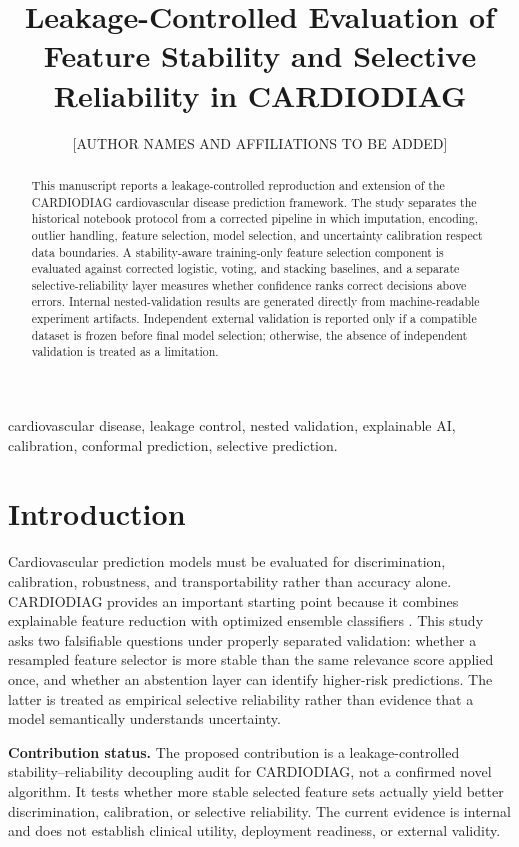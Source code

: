 \documentclass[journal]{IEEEtran}
\title{Leakage-Controlled Evaluation of Feature Stability and Selective Reliability in CARDIODIAG}
\author{[AUTHOR NAMES AND AFFILIATIONS TO BE ADDED]}
\begin{document}
\maketitle

\begin{abstract}
This manuscript reports a leakage-controlled reproduction and extension of the
CARDIODIAG cardiovascular disease prediction framework. The study separates the
historical notebook protocol from a corrected pipeline in which imputation,
encoding, outlier handling, feature selection, model selection, and uncertainty
calibration respect data boundaries. A stability-aware training-only feature
selection component is evaluated against corrected logistic, voting, and
stacking baselines, and a separate selective-reliability layer measures whether
confidence ranks correct decisions above errors. Internal nested-validation
results are generated directly from machine-readable experiment artifacts.
Independent external validation is reported only if a compatible dataset is
frozen before final model selection; otherwise, the absence of independent
validation is treated as a limitation.
\end{abstract}

\begin{IEEEkeywords}
cardiovascular disease, leakage control, nested validation, explainable AI,
calibration, conformal prediction, selective prediction.
\end{IEEEkeywords}

\section{Introduction}
Cardiovascular prediction models must be evaluated for discrimination,
calibration, robustness, and transportability rather than accuracy alone.
CARDIODIAG provides an important starting point because it combines explainable
feature reduction with optimized ensemble classifiers \cite{khan2026cardiodiag}.
This study asks two falsifiable questions under properly separated validation:
whether a resampled feature selector is more stable than the same relevance
score applied once, and whether an abstention layer can identify higher-risk
predictions. The latter is treated as empirical selective reliability rather
than evidence that a model semantically understands uncertainty.

\textbf{Contribution status.} The proposed contribution is a
leakage-controlled stability--reliability decoupling audit for CARDIODIAG, not
a confirmed novel algorithm. It tests whether more stable selected feature sets
actually yield better discrimination, calibration, or selective reliability.
The current evidence is internal and does not establish clinical utility,
deployment readiness, or external validity.
\end{document}
